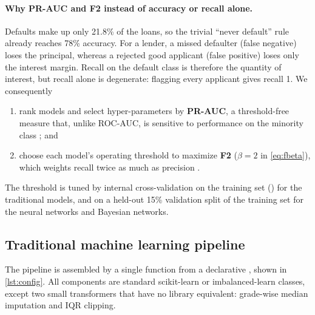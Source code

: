 \paragraph{Why PR-AUC and F2 instead of accuracy or recall alone.}
Defaults make up only 21.8\% of the loans, so the trivial ``never default'' rule already reaches 78\% accuracy.
For a lender, a missed defaulter (false negative) loses the principal, whereas a rejected good applicant (false positive) loses only the interest margin.
Recall on the default class is therefore the quantity of interest, but recall alone is degenerate: flagging every applicant gives recall 1.
We consequently
\begin{enumerate}[nosep]
  \item rank models and select hyper-parameters by \textbf{PR-AUC}, a threshold-free measure that, unlike ROC-AUC, is sensitive to performance on the minority class \cite{saito2015}; and
  \item choose each model's operating threshold to maximize \textbf{F2} ($\beta = 2$ in \cref{eq:fbeta}), which weights recall twice as much as precision \cite{rijsbergen1979}.
\end{enumerate}
The threshold is tuned by internal cross-validation on the training set () for the traditional models, and on a held-out 15\% validation split of the training set for the neural networks and Bayesian networks.

\subsection{Traditional machine learning pipeline}
\label{subsec:trad}

The pipeline is assembled by a single function from a declarative , shown in \cref{lst:config}.
All components are standard scikit-learn \cite{sklearn} or imbalanced-learn \cite{imblearn} classes, except two small transformers that have no library equivalent: grade-wise median imputation and IQR clipping.

